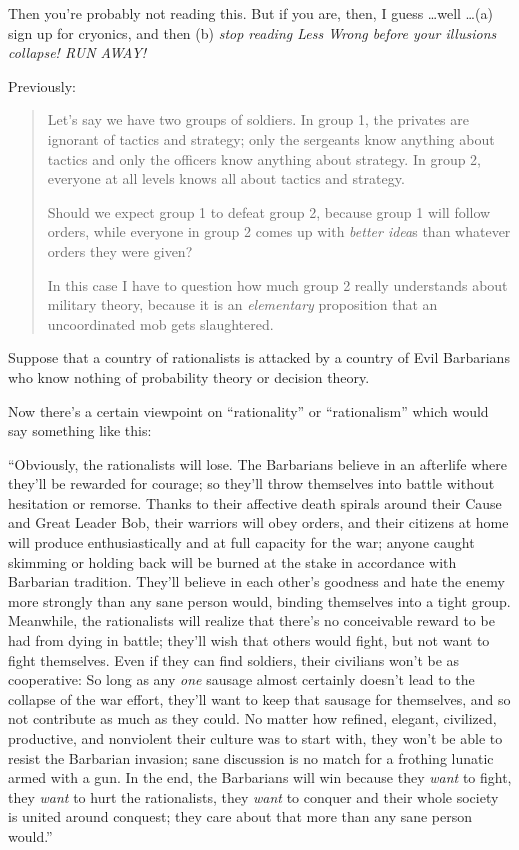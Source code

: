 {
 Then you're probably not reading this. But if you
are, then, I guess \ldots well \ldots (a) sign up for cryonics, and then
(b) \textit{stop reading Less Wrong before your illusions collapse! RUN
AWAY!}}

\myendsectiontext


{
 Previously:}

\begin{quotation}
{
 Let's say we have two groups of soldiers. In group
1, the privates are ignorant of tactics and strategy; only the
sergeants know anything about tactics and only the officers know
anything about strategy. In group 2, everyone at all levels knows all
about tactics and strategy.}

{
 Should we expect group 1 to defeat group 2, because group 1 will
follow orders, while everyone in group 2 comes up with \textit{better
idea}s than whatever orders they were given?}

{
 In this case I have to question how much group 2 really
understands about military theory, because it is an \textit{elementary}
proposition that an uncoordinated mob gets slaughtered.}
\end{quotation}

{
 Suppose that a country of rationalists is attacked by a country of
Evil Barbarians who know nothing of probability theory or decision
theory.}

{
 Now there's a certain viewpoint on
``rationality'' or
``rationalism'' which would say
something like this:}

{
 ``Obviously, the rationalists will lose. The
Barbarians believe in an afterlife where they'll be
rewarded for courage; so they'll throw themselves into
battle without hesitation or remorse. Thanks to their affective death
spirals around their Cause and Great Leader Bob, their warriors will
obey orders, and their citizens at home will produce enthusiastically
and at full capacity for the war; anyone caught skimming or holding
back will be burned at the stake in accordance with Barbarian
tradition. They'll believe in each
other's goodness and hate the enemy more strongly than
any sane person would, binding themselves into a tight group.
Meanwhile, the rationalists will realize that there's
no conceivable reward to be had from dying in battle;
they'll wish that others would fight, but not want to
fight themselves. Even if they can find soldiers, their civilians
won't be as cooperative: So long as any \textit{one}
sausage almost certainly doesn't lead to the collapse
of the war effort, they'll want to keep that sausage
for themselves, and so not contribute as much as they could. No matter
how refined, elegant, civilized, productive, and nonviolent their
culture was to start with, they won't be able to resist
the Barbarian invasion; sane discussion is no match for a frothing
lunatic armed with a gun. In the end, the Barbarians will win because
they \textit{want} to fight, they \textit{want} to hurt the
rationalists, they \textit{want} to conquer and their whole society is
united around conquest; they care about that more than any sane person
would.''}


